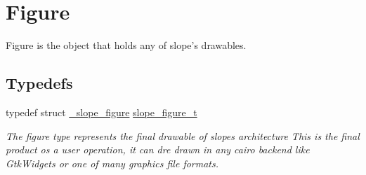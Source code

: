 \hypertarget{group__Figure}{\section{Figure}
\label{group__Figure}
}


Figure is the object that holds any of slope's drawables.  


\subsection*{Typedefs}
\begin{DoxyCompactItemize}
\item 
\hypertarget{group__Figure_ga507cc82eeca8255d6c0f603ffdaeb59e}{typedef struct \hyperlink{struct__slope__figure}{\+\_\+slope\+\_\+figure} \hyperlink{group__Figure_ga507cc82eeca8255d6c0f603ffdaeb59e}{slope\+\_\+figure\+\_\+t}}\label{group__Figure_ga507cc82eeca8255d6c0f603ffdaeb59e}

\begin{DoxyCompactList}\small\item\em The figure type represents the final drawable of slopes architecture This is the final product os a user operation, it can dre drawn in any cairo backend like Gtk\+Widgets or one of many graphics file formats. \end{DoxyCompactList}\end{DoxyCompactItemize}
